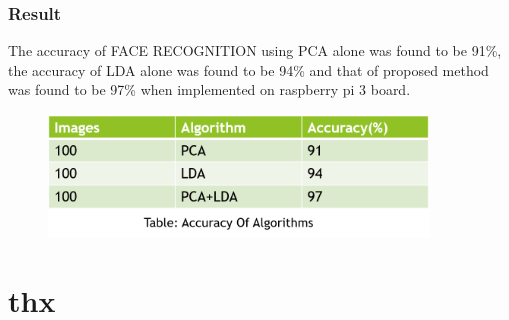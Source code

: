 \documentclass[xcolor=dvipsnames]{beamer}
\newenvironment{reference}[2]{
  \begin{textblock*}{\textwidth}(#1,#2)
     \bgroup\fontsize{6pt}{\baselineskip}\selectfont\color[RGB]{0,112,192}}{\egroup\end{textblock*}}
\begin{document}
    \begin{frame}
    \frametitle{Result}
    The accuracy of FACE RECOGNITION using PCA alone was found to be 91\%, the accuracy of LDA alone was found to be 94\% and that of proposed method was found to be 97\% when implemented on raspberry pi 3 board. 
    \begin{figure}[H]
        \graphicspath{{figs/}}
        \includegraphics[width=0.9\textwidth]{img7.png}
    \end{figure}
    \end{frame}
    
    \section*{thx}
        \begin{frame}
        \begin{center}
        \fontsize{30pt}{\baselineskip}\selectfont {}
        \end{center}
        \begin{reference}{0mm}{80mm}
        \end{reference}
        \end{frame}
\end{document}

